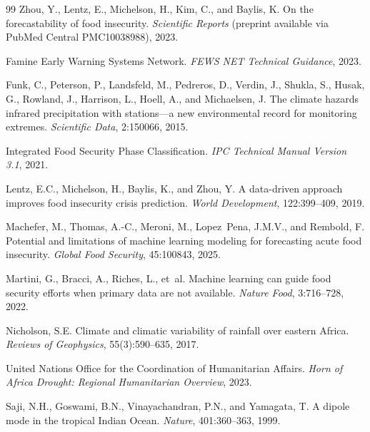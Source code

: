 \documentclass[11pt,letterpaper]{article}
\begin{document}
\begin{thebibliography}{99}
Zhou, Y., Lentz, E., Michelson, H., Kim, C., and Baylis, K.
\newblock On the forecastability of food insecurity.
\newblock \textit{Scientific Reports} (preprint available via PubMed Central PMC10038988), 2023.

Famine Early Warning Systems Network.
\newblock \textit{FEWS NET Technical Guidance}, 2023.

Funk, C., Peterson, P., Landsfeld, M., Pedreros, D., Verdin, J., Shukla, S., Husak, G., Rowland, J., Harrison, L., Hoell, A., and Michaelsen, J.
\newblock The climate hazards infrared precipitation with stations---a new environmental record for monitoring extremes.
\newblock \textit{Scientific Data}, 2:150066, 2015.

Integrated Food Security Phase Classification.
\newblock \textit{IPC Technical Manual Version 3.1}, 2021.

Lentz, E.C., Michelson, H., Baylis, K., and Zhou, Y.
\newblock A data-driven approach improves food insecurity crisis prediction.
\newblock \textit{World Development}, 122:399--409, 2019.

Machefer, M., Thomas, A.-C., Meroni, M., Lopez~Pena, J.M.V., and Rembold, F.
\newblock Potential and limitations of machine learning modeling for forecasting acute food insecurity.
\newblock \textit{Global Food Security}, 45:100843, 2025.

Martini, G., Bracci, A., Riches, L., et~al.
\newblock Machine learning can guide food security efforts when primary data are not available.
\newblock \textit{Nature Food}, 3:716--728, 2022.

Nicholson, S.E.
\newblock Climate and climatic variability of rainfall over eastern Africa.
\newblock \textit{Reviews of Geophysics}, 55(3):590--635, 2017.

United Nations Office for the Coordination of Humanitarian Affairs.
\newblock \textit{Horn of Africa Drought: Regional Humanitarian Overview}, 2023.

Saji, N.H., Goswami, B.N., Vinayachandran, P.N., and Yamagata, T.
\newblock A dipole mode in the tropical Indian Ocean.
\newblock \textit{Nature}, 401:360--363, 1999.


\end{thebibliography}
\end{document}
